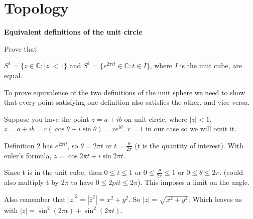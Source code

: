 \section{Topology}

\textbf{Equivalent definitions of the unit circle}

Prove that

$S^1 = \{ z \in \mathbb{C} : |z| < 1 \}$ and
$S^1 = \{ e^{2\pi it} \in \mathbb{C} : t \in I \}$, where $I$ is the unit cube, are equal.

To prove equivalence of the two definitions of the unit sphere we need to show that every
point satisfying one definition also satisfies the other, and vice versa.

Suppose you have the point $z = a + ib$ on unit circle, where $|z| < 1$.
$z = a + ib = r (\cos \theta + i \sin \theta) = r e^{i\theta}$.
$r = 1$ in our case so we will omit it.

Definition 2 has $e^{2 \pi it}$, so $\theta = 2\pi  t$ or $t = \frac{\theta}{2\pi}$ (t is the quantity of interest).
With euler’s formula, $z = \cos 2\pi t + i \sin 2\pi t$.

Since t is in the unit cube, then $0 \leq t \leq 1$ or $0 \leq \frac{\theta}{2\pi} \leq 1$ or $0 \leq \theta \leq 2\pi$.
(could also multiply t by $2\pi$ to have $0 \leq 2pit \leq 2\pi$).
This imposes a limit on the angle.

Also remember that $|z|^2 = |\hat{z} ^2| = x^2 + y^2$.
So $|z| = \sqrt{ x^2 + y^2 }$.
Which leaves us with $|z| = \sin^2 (2\pi t) + \sin^2 (2\pi t)$.
\\~\\

